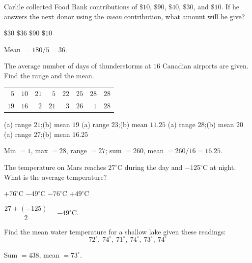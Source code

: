 \question[5]
Carlile collected Food Bank contributions of $\$10$, $\$90$, $\$40$, $\$30$, and $\$10$. If he answers the next donor using the \emph{mean} contribution, what amount will he give?
\begin{choices}
  \choice $\$30$
  \CorrectChoice $\$36$
  \choice $\$90$
  \choice $\$10$
\end{choices}
\begin{solution}
  Mean $= 180/5 = 36$.
\end{solution}

\question[5]
The average number of days of thunderstorms at $16$ Canadian airports are given. Find the range and the mean.
\begin{center}
  \small
  \begin{tabular}{rrrrrrrr}
    $5$ & $10$ & $21$ & $5$ & $22$ & $25$ & $28$ & $28$ \\
    $19$ & $16$ & $2$ & $21$ & $3$ & $26$ & $1$ & $28$ \\
  \end{tabular}
\end{center}
\begin{choices}
  \choice (a) range $21$;\quad (b) mean $19$
  \choice (a) range $23$;\quad (b) mean $11.25$
  \choice (a) range $28$;\quad (b) mean $20$
  \CorrectChoice (a) range $27$;\quad (b) mean $16.25$
\end{choices}
\begin{solution}
  Min $=1$, max $=28$, range $=27$; sum $=260$, mean $=260/16=16.25$.
\end{solution}

\question[5]
The temperature on Mars reaches $27^{\circ}\mathrm{C}$ during the day and $-125^{\circ}\mathrm{C}$ at night. What is the average temperature?
\begin{choices}
  \choice $+76^{\circ}\mathrm{C}$
  \CorrectChoice $-49^{\circ}\mathrm{C}$
  \choice $-76^{\circ}\mathrm{C}$
  \choice $+49^{\circ}\mathrm{C}$
\end{choices}
\begin{solution}
  $\dfrac{27+(-125)}{2}=-49^{\circ}\mathrm{C}$.
\end{solution}


\newpage


\question[5]
Find the mean water temperature for a shallow lake given these readings:
\[
  72^{\circ},\ 74^{\circ},\ 71^{\circ},\ 74^{\circ},\ 73^{\circ},\ 74^{\circ}
\]
\begin{solution}
  Sum $=438$, mean $=73^{\circ}$.
\end{solution}

